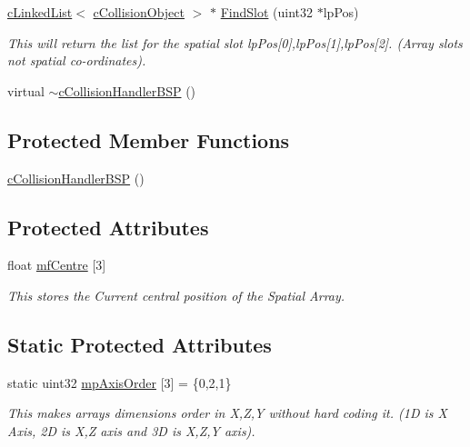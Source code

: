 \begin{DoxyCompactItemize}
\hyperlink{classc_linked_list}{cLinkedList}$<$ \hyperlink{classc_collision_object}{cCollisionObject} $>$ $\ast$ \hyperlink{classc_collision_handler_b_s_p_a08fa8650b8200a442b68c123220d7c40}{FindSlot} (uint32 $\ast$lpPos)
\begin{DoxyCompactList}\small\item\em This will return the list for the spatial slot lpPos\mbox{[}0\mbox{]},lpPos\mbox{[}1\mbox{]},lpPos\mbox{[}2\mbox{]}. (Array slots not spatial co-\/ordinates). \item\end{DoxyCompactList}\item 
virtual \hyperlink{classc_collision_handler_b_s_p_a44222f6325b435e75bf2325f3b98c629}{$\sim$cCollisionHandlerBSP} ()
\end{DoxyCompactItemize}
\subsection*{Protected Member Functions}
\begin{DoxyCompactItemize}
\item 
\hyperlink{classc_collision_handler_b_s_p_a39c5eaabff78246918df294b1f5492d9}{cCollisionHandlerBSP} ()
\end{DoxyCompactItemize}
\subsection*{Protected Attributes}
\begin{DoxyCompactItemize}
\item 
float \hyperlink{classc_collision_handler_b_s_p_a2f5ddea62a1158ccdfc29539a9c23a8d}{mfCentre} \mbox{[}3\mbox{]}
\begin{DoxyCompactList}\small\item\em This stores the Current central position of the Spatial Array. \item\end{DoxyCompactList}\end{DoxyCompactItemize}
\subsection*{Static Protected Attributes}
\begin{DoxyCompactItemize}
\item 
static uint32 \hyperlink{classc_collision_handler_b_s_p_a521e19fe8bb2a85bda87223955b2f696}{mpAxisOrder} \mbox{[}3\mbox{]} = \{0,2,1\}
\begin{DoxyCompactList}\small\item\em This makes arrays dimensions order in X,Z,Y without hard coding it. (1D is X Axis, 2D is X,Z axis and 3D is X,Z,Y axis). \item\end{DoxyCompactList}\end{DoxyCompactItemize}
